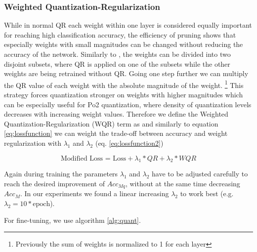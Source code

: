 \subsubsection{Weighted Quantization-Regularization}
\label{subsec:wqr}
While in normal QR each weight within one layer is considered equally important for reaching high classification accuracy, the efficiency of pruning \cite{Han2015a,Yang2017,Dong2017} shows that especially weights with small magnitudes can be changed without reducing the accuracy of the network.
Similarly to \cite{Zhang2015}, the weights can be divided into two disjoint subsets, where QR is applied on one of the subsets while the other weights are being retrained without QR. Going one step further we can multiply the QR value of each weight with the absolute magnitude of the weight.
\footnote{Previously the sum of weights is normalized to 1 for each layer}
This strategy forces quantization stronger on weights with higher magnitudes which can be especially useful for Po2 quantization, where density of quantization levels decreases with increasing weight values. Therefore we define the Weighted Quantization-Regularization (WQR) term as
and similarly to equation \ref{eq:lossfunction} we can weight the trade-off between accuracy and weight regularization with $\lambda _1$ and $\lambda _2$ (eq. \ref{eq:lossfunction2})

\begin{equation}\label{eq:lossfunction2}
\textrm{Modified Loss = Loss} + \lambda _1 *QR + \lambda _2 *WQR
\end{equation}

Again during training the parameters $\lambda_1$ and $\lambda_2$ have to be adjusted carefully to reach the desired improvement of $Acc_{Mq}$, without at the same time decreasing $Acc_{M}$. In our experiments we found a linear increasing $\lambda_2$ to work best (e.g. $\lambda_2 = 10*\textrm{epoch}$).

For fine-tuning, we use algorithm \ref{alg:quant}.

